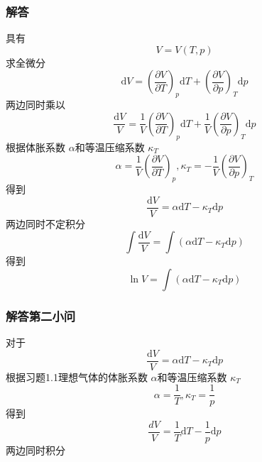 \subsubsection{解答}
具有
\begin{equation}
    V=V\left( T,p \right) 
\end{equation}
求全微分
\begin{equation}
    \mathrm{d}V=\left( \frac{\partial V}{\partial T} \right) _p\mathrm{d}T+\left( \frac{\partial V}{\partial p} \right) _T\mathrm{d}p
\end{equation}
两边同时乘以
\begin{equation}
    \frac{\mathrm{d}V}{V}=\frac{1}{V}\left( \frac{\partial V}{\partial T} \right) _p\mathrm{d}T+\frac{1}{V}\left( \frac{\partial V}{\partial p} \right) _T\mathrm{d}p
\end{equation}
根据体胀系数 $\alpha$和等温压缩系数 $\kappa_T$
\begin{equation}
    \alpha =\frac{1}{V}\left( \frac{\partial V}{\partial T} \right) _p,\kappa _T=-\frac{1}{V}\left( \frac{\partial V}{\partial p} \right) _T
\end{equation}
得到
\begin{equation}
    \frac{\mathrm{d}V}{V}=\alpha \mathrm{d}T-\kappa _T\mathrm{d}p
\end{equation}
两边同时不定积分
\begin{equation}
    \int{\frac{\mathrm{d}V}{V}}=\int{\left( \alpha \mathrm{d}T-\kappa _T\mathrm{d}p \right)}
\end{equation}
得到
\begin{equation}
    \ln V=\int{\left( \alpha \mathrm{d}T-\kappa _T\mathrm{d}p \right)}
\end{equation}

\subsubsection{解答第二小问}
对于
\begin{equation}
    \frac{\mathrm{d}V}{V}=\alpha \mathrm{d}T-\kappa _T\mathrm{d}p
\end{equation}
根据习题1.1理想气体的体胀系数 $\alpha$和等温压缩系数 $\kappa_T$
\begin{equation}
    \alpha =\frac{1}{T},\kappa _T=\frac{1}{p}
\end{equation}
得到
\begin{equation}
    \frac{dV}{V}=\frac{1}{T}\mathrm{d}T-\frac{1}{p}\mathrm{d}p
\end{equation}
两边同时积分


